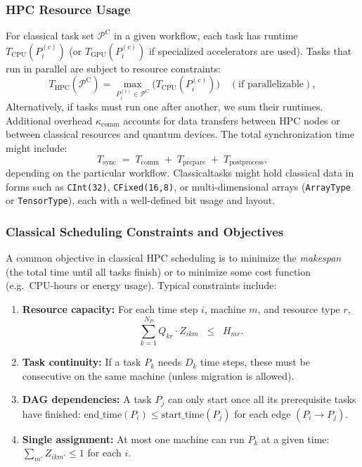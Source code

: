 \documentclass{article}
\begin{document}
\subsubsection{HPC Resource Usage}
For classical task set \(\mathcal{P^{\mathrm{C}}}\) in a given workflow, each task has runtime $T_{\mathrm{CPU}}(P^{(c)}_i)$ (or $T_{\mathrm{GPU}}(P^{(c)}_i)$ if specialized accelerators are used). Tasks that run in parallel are subject to resource constraints:
\begin{equation}\label{eq:Tclassical}
T_{\mathrm{HPC}}(\mathcal{P^{\mathrm{C}}}) = \max_{P^{(c)}_i \in \mathcal{P^{\mathrm{C}}}} \bigl(T_{\mathrm{CPU}}(P^{(c)}_i)\bigr)\quad (\text{if parallelizable}),
\end{equation}
Alternatively, if tasks must run one after another, we sum their runtimes. Additional overhead \(\kappa_{\mathrm{comm}}\) accounts for data transfers between HPC nodes or between classical resources and quantum devices. The total synchronization time might include:
\[
T_{\mathrm{sync}} \;=\; T_{\mathrm{comm}} \;+\; T_{\mathrm{prepare}} \;+\; T_{\mathrm{postprocess}},
\]
depending on the particular workflow. Classicaltasks might hold classical data in forms such as \texttt{CInt(32)}, \texttt{CFixed(16,8)}, or multi-dimensional arrays (\texttt{ArrayType} or \texttt{TensorType}), each with a well-defined bit usage and layout.
\subsubsection{Classical Scheduling Constraints and Objectives}
A common objective in classical HPC scheduling is to minimize the \emph{makespan} (the total time until all tasks finish) or to minimize some cost function (e.g.\ CPU-hours or energy usage). Typical constraints include:

\begin{enumerate}
\item \textbf{Resource capacity:} For each time step \(i\), machine \(m\), and resource type \(r\),
\[
\sum_{k=1}^{N_P} Q_{kr} \cdot Z_{ikm} \;\;\le\;\; H_{mr}.
\]
\item \textbf{Task continuity:} If a task \(P_k\) needs \(D_k\) time steps, these must be consecutive on the same machine (unless migration is allowed).
\item \textbf{DAG dependencies:} A task \(P_j\) can only start once all its prerequisite tasks have finished: \(\mathrm{end\_time}(P_i) \le \mathrm{start\_time}(P_j)\) for each edge \((P_i \to P_j)\).
\item \textbf{Single assignment:} At most one machine can run \(P_k\) at a given time: \(\sum_{m'} Z_{ikm'} \le 1\) for each \(i\).
\end{enumerate}
\end{document}
